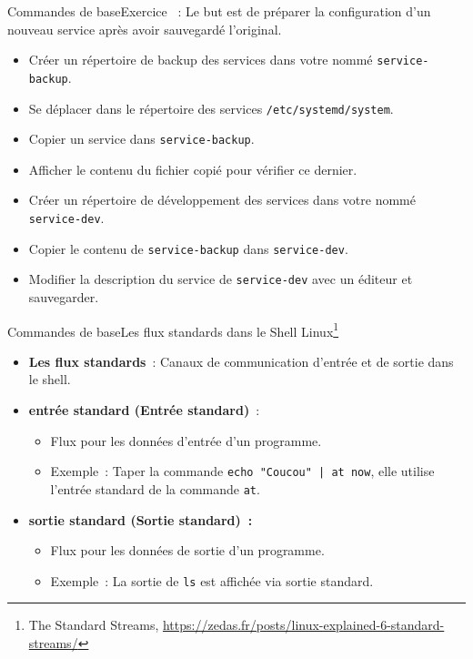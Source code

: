 \documentclass{beamer}
\begin{document}
    \begin{frame}{Commandes de base}{Exercice \execcounterdispinc{}~:}
        Le but est de préparer la configuration d'un nouveau service après avoir sauvegardé l'original.
        \begin{itemize}
            \item Créer un répertoire de backup des services dans votre  nommé \lstinline{service-backup}.
            \item Se déplacer dans le répertoire des services \lstinline{/etc/systemd/system}.
            \item Copier un service dans \lstinline{service-backup}.
            \item Afficher le contenu du fichier copié pour vérifier ce dernier.
            \item Créer un répertoire de développement des services dans votre  nommé \lstinline{service-dev}.
            \item Copier le contenu de \lstinline{service-backup} dans \lstinline{service-dev}.
            \item Modifier la description du service de \lstinline{service-dev} avec un éditeur et sauvegarder.
        \end{itemize}
    \end{frame}

    \begin{frame}{Commandes de base}{Les flux standards dans le Shell Linux\footnote{\label{standard-stream}The Standard Streams, \url{https://zedas.fr/posts/linux-explained-6-standard-streams/}}}
        \begin{itemize}
            \item \textbf{Les flux standards}~: Canaux de communication d'entrée et de sortie dans le shell.
            \item \textbf{entrée standard (Entrée standard)}~:
            \begin{itemize}
                \item Flux pour les données d'entrée d'un programme.
                \item Exemple~: Taper la commande \lstinline{echo "Coucou" | at now}, elle utilise l'entrée standard de la commande \lstinline{at}.
            \end{itemize}
            \item \textbf{sortie standard (Sortie standard)~:}
            \begin{itemize}
                \item Flux pour les données de sortie d'un programme.
                \item Exemple~: La sortie de \lstinline{ls} est affichée via sortie standard.
            \end{itemize}
        \end{itemize}
    \end{frame}
\end{document}
